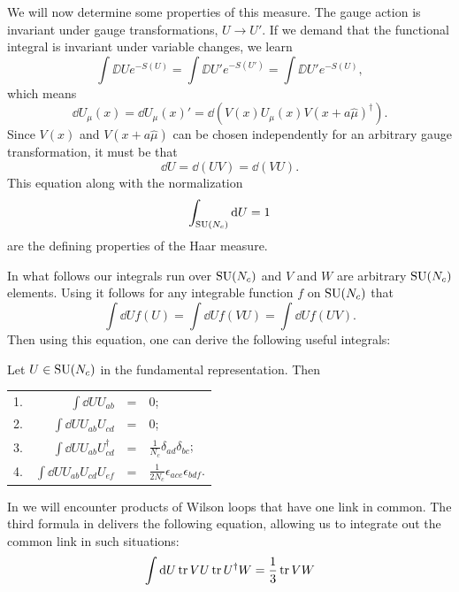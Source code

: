 We will now determine some properties of this measure. The gauge action is
invariant under gauge transformations, $U\to U'$. If we demand that the
functional integral is invariant under variable changes, we learn
\begin{equation}
  \int\DD U e^{-S(U)}
  =\int\DD U' e^{-S(U')}
  =\int\DD U' e^{-S(U)},
\end{equation}
which means
\begin{equation}
  \dd U_\mu(x)
   =\dd U_\mu(x)'=\dd\left(V(x)U_\mu(x)V(x+a\hat{\mu})^\dagger\right).
\end{equation}
Since $V(x)$ and $V(x+a\hat{\mu})$ can be chosen independently for an arbitrary
gauge transformation, it must be that
\begin{equation}\label{eq:haarcommute}
 \dd U=\dd(UV)=\dd(VU).
\end{equation}
This equation along with the normalization
\begin{equation}\label{eq:haarnorm}
  \int_{\operatorname{SU}(N_c)} \dd U=1
\end{equation}
are the defining properties of the Haar measure.

In what follows our integrals run over $\operatorname{SU}(N_c)$
and $V$ and $W$ are arbitrary $\operatorname{SU}(N_c)$ elements.
Using  it follows for any 
integrable function $f$ on $\operatorname{SU}(N_c)$ that
\begin{equation}
  \int\dd Uf(U)=\int\dd Uf(VU)=\int\dd Uf(UV).
\end{equation}
Then using this equation, one can derive the following
useful integrals:
\begin{proposition}{}{}\label{prp:haar}
  Let $U\in\operatorname{SU}(N_c)$ in the fundamental representation. Then
  \begin{center}\begin{tabular}{lrcl}
  1. &$\int \dd U U_{ab}$ &=& 0;\\[1mm]
  2. &$\int \dd U U_{ab}U_{cd}$ &=& 0;\\[1mm]
  3. &$\int \dd U U_{ab}U^\dagger_{cd}$ 
       &=& $\frac{1}{N_c}\delta_{ad}\delta_{bc}$;\\[1mm]
  4. &$\int \dd U U_{ab}U_{cd}U_{ef}$ 
       &=& $\frac{1}{2 N_c}\epsilon_{ace}\epsilon_{bdf}$.
  \end{tabular}\end{center}
\end{proposition}
In  we will encounter products of Wilson
loops that have one link in common. The third formula in
 delivers the following equation, allowing
us to integrate out the common link in such situations:
\begin{equation}
  \int \dd U\tr VU\tr U^\dagger W=\frac{1}{3}\tr VW
\end{equation}

